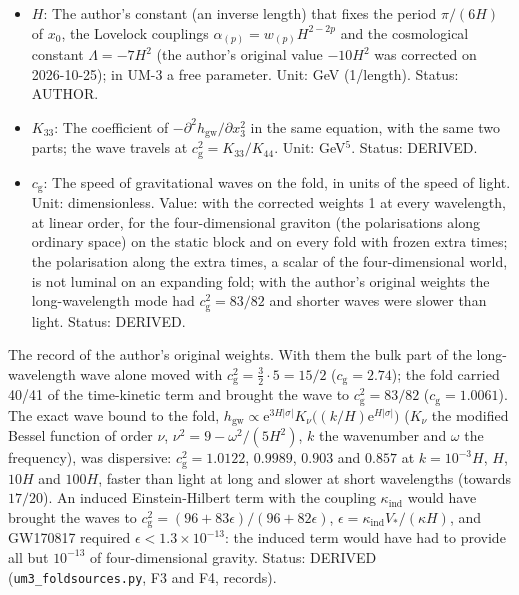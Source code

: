 \documentclass[
  10pt,
]{article}
\begin{document}
\begin{itemize}
  bulk plus the thin part at the fold. Unit: GeV\(^5\)
  (\(\kappa K_{44}\) is a length). Status: DERIVED.
\item
  \(H\): The author's constant (an inverse length) that fixes the period
  \(\pi/(6H)\) of \(x_0\), the Lovelock couplings
  \(\alpha_{(p)} = w_{(p)}H^{2-2p}\) and the cosmological constant
  \(\Lambda = -7H^2\) (the author's original value \(-10H^2\) was
  corrected on 2026-10-25); in UM-3 a free parameter. Unit: GeV
  (1/length). Status: AUTHOR.
\item
  \(K_{33}\): The coefficient of
  \(-\partial^2h_{\mathrm{gw}}/\partial x_3^2\) in the same equation,
  with the same two parts; the wave travels at
  \(c_{\mathrm{g}}^2 = K_{33}/K_{44}\). Unit: GeV\(^5\). Status:
  DERIVED.
\item
  \(c_{\mathrm{g}}\): The speed of gravitational waves on the fold, in
  units of the speed of light. Unit: dimensionless. Value: with the
  corrected weights 1 at every wavelength, at linear order, for the
  four-dimensional graviton (the polarisations along ordinary space) on
  the static block and on every fold with frozen extra times; the
  polarisation along the extra times, a scalar of the four-dimensional
  world, is not luminal on an expanding fold; with the author's original
  weights the long-wavelength mode had \(c_{\mathrm{g}}^2 = 83/82\) and
  shorter waves were slower than light. Status: DERIVED.
\end{itemize}

The record of the author's original weights. With them the bulk part of
the long-wavelength wave alone moved with
\(c_{\mathrm{g}}^2 = \frac32\cdot 5 = 15/2\)
(\(c_{\mathrm{g}} = 2.74\)); the fold carried 40/41 of the time-kinetic
term and brought the wave to \(c_{\mathrm{g}}^2 = 83/82\)
(\(c_{\mathrm{g}} = 1.0061\)). The exact wave bound to the fold,
\(h_{\mathrm{gw}} \propto \mathrm{e}^{3H\lvert\sigma\rvert}K_\nu\big((k/H)\mathrm{e}^{H\lvert\sigma\rvert}\big)\)
(\(K_\nu\) the modified Bessel function of order \(\nu\),
\(\nu^2 = 9 - \omega^2/(5H^2)\), \(k\) the wavenumber and \(\omega\) the
frequency), was dispersive: \(c_{\mathrm{g}}^2 = 1.0122\), \(0.9989\),
\(0.903\) and \(0.857\) at \(k = 10^{-3}H\), \(H\), \(10H\) and
\(100H\), faster than light at long and slower at short wavelengths
(towards \(17/20\)). An induced Einstein-Hilbert term with the coupling
\(\kappa_{\mathrm{ind}}\) would have brought the waves to
\(c_{\mathrm{g}}^2 = (96 + 83\epsilon)/(96 + 82\epsilon)\),
\(\epsilon = \kappa_{\mathrm{ind}}V_*/(\kappa H)\), and GW170817
required \(\epsilon < 1.3\times10^{-13}\): the induced term would have
had to provide all but \(10^{-13}\) of four-dimensional gravity. Status:
DERIVED (\texttt{um3\_foldsources.py}, F3 and F4, records).
\end{document}
